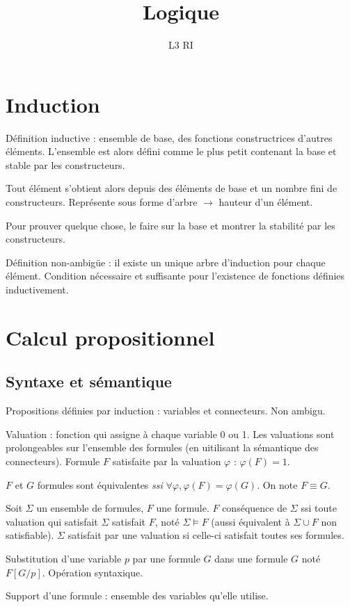 \documentclass[french]{article}
\title{Logique}
\date{}
\author{L3 RI}
\begin{document}
\maketitle
\tableofcontents
\section{Induction}
Définition inductive : ensemble de base, des fonctions constructrices d'autres éléments. L'ensemble est alors défini comme le plus petit contenant la base et stable par les constructeurs.

Tout élément s'obtient alors depuis des éléments de base et un nombre fini de constructeurs. Représente sous forme d'arbre $\rightarrow$ hauteur d'un élément.

Pour prouver quelque chose, le faire sur la base et montrer la stabilité par les constructeurs.

Définition non-ambigüe : il existe un unique arbre d'induction pour chaque élément. Condition nécessaire et suffisante pour l'existence de fonctions définies inductivement.

\section{Calcul propositionnel}
\subsection{Syntaxe et sémantique}
Propositions définies par induction : variables et connecteurs. Non ambigu.

Valuation : fonction qui assigne à chaque variable 0 ou 1.
Les valuations sont prolongeables sur l'ensemble des formules (en uitilisant la sémantique des connecteurs). Formule $F$ satisfaite par la valuation $\varphi$ : $\varphi (F) = 1$.

$F$ et $G$ formules sont équivalentes \emph{ssi} $\forall\varphi ,\varphi (F) = \varphi (G)$. On note $F\equiv G$. 

Soit $\Sigma$ un ensemble de formules, $F$ une formule. $F$ conséquence de $\Sigma$ ssi toute valuation qui satisfait $\Sigma$ satisfait $F$, noté $\Sigma\models F$ (aussi équivalent à $\Sigma\cup F$ non satisfiable). $\Sigma$ satisfait par une valuation si celle-ci satisfait toutes ses formules.

Substitution d'une variable $p$ par une formule $G$ dans une formule $G$ noté $F[G/p]$. Opération syntaxique.

Support d'une formule : ensemble des variables qu'elle utilise.
\end{document}

